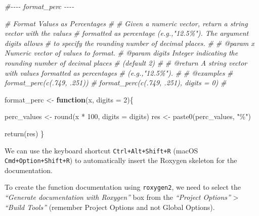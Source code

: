 \documentclass[
  11pt,
]{book}
\newenvironment{Shaded}{\begin{snugshade}}{\end{snugshade}}
\newcommand{\AttributeTok}[1]{\textcolor[rgb]{0.77,0.63,0.00}{#1}}
\newcommand{\CommentTok}[1]{\textcolor[rgb]{0.56,0.35,0.01}{\textit{#1}}}
\newcommand{\ControlFlowTok}[1]{\textcolor[rgb]{0.13,0.29,0.53}{\textbf{#1}}}
\newcommand{\DecValTok}[1]{\textcolor[rgb]{0.00,0.00,0.81}{#1}}
\newcommand{\FunctionTok}[1]{\textcolor[rgb]{0.00,0.00,0.00}{#1}}
\newcommand{\NormalTok}[1]{#1}
\newcommand{\OtherTok}[1]{\textcolor[rgb]{0.56,0.35,0.01}{#1}}
\newcommand{\SpecialCharTok}[1]{\textcolor[rgb]{0.00,0.00,0.00}{#1}}
\newcommand{\StringTok}[1]{\textcolor[rgb]{0.31,0.60,0.02}{#1}}
\begin{document}
\begin{Shaded}
\begin{Highlighting}[]
\CommentTok{\#{-}{-}{-}{-}    format\_perc    {-}{-}{-}{-}}

\CommentTok{\#\textquotesingle{} Format Values as Percentages}
\CommentTok{\#\textquotesingle{} }
\CommentTok{\#\textquotesingle{} Given a numeric vector, return a string vector with the values }
\CommentTok{\#\textquotesingle{} formatted as percentage (e.g.,"12.5\%"). The argument \textasciigrave{}digits\textasciigrave{} allows }
\CommentTok{\#\textquotesingle{} to specify the rounding number of decimal places.}
\CommentTok{\#\textquotesingle{}}
\CommentTok{\#\textquotesingle{} @param x Numeric vector of values to format.}
\CommentTok{\#\textquotesingle{} @param digits Integer indicating the rounding number of decimal places}
\CommentTok{\#\textquotesingle{}               (default 2)}
\CommentTok{\#\textquotesingle{}}
\CommentTok{\#\textquotesingle{} @return A string vector with values formatted as percentages }
\CommentTok{\#\textquotesingle{}  (e.g.,"12.5\%").}
\CommentTok{\#\textquotesingle{}}
\CommentTok{\#\textquotesingle{} @examples}
\CommentTok{\#\textquotesingle{} format\_perc(c(.749, .251))}
\CommentTok{\#\textquotesingle{} format\_perc(c(.749, .251), digits = 0)}
\CommentTok{\#\textquotesingle{} }

\NormalTok{format\_perc }\OtherTok{\textless{}{-}} \ControlFlowTok{function}\NormalTok{(x, }\AttributeTok{digits =} \DecValTok{2}\NormalTok{)\{}
      
\NormalTok{  perc\_values }\OtherTok{\textless{}{-}} \FunctionTok{round}\NormalTok{(x }\SpecialCharTok{*} \DecValTok{100}\NormalTok{, }\AttributeTok{digits =}\NormalTok{ digits)}
\NormalTok{  res }\OtherTok{\textless{}{-}} \FunctionTok{paste0}\NormalTok{(perc\_values, }\StringTok{"\%"}\NormalTok{)}
  
  \FunctionTok{return}\NormalTok{(res)}
\NormalTok{\}}
\end{Highlighting}
\end{Shaded}

We can use the keyboard shortcut \texttt{Ctrl+Alt+Shift+R} (macOS \texttt{Cmd+Option+Shift+R}) to automatically insert the Roxygen skeleton for the documentation.

To create the function documentation using \texttt{roxygen2}, we need to select the \emph{``Generate documentation with Roxygen''} box from the \emph{``Project Options''} \textgreater{} \emph{``Build Tools''} (remember Project Options and not Global Options).
\end{document}
